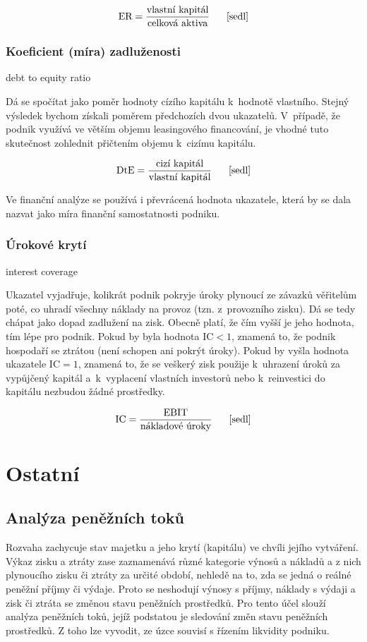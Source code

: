 $$\vz{ER}{vlastní kapitál}{celková aktiva} \scite{sedl}$$

\subsubsection{Koeficient (míra) zadluženosti}
debt to equity ratio

Dá se spočítat jako poměr hodnoty cízího kapitálu k~hodnotě vlastního. Stejný výsledek bychom získali poměrem předchozích dvou ukazatelů. V~případě, že podnik využívá ve větším objemu leasingového financování, je vhodné tuto skutečnost zohlednit přičtením objemu k~cizímu kapitálu. 

$$\vz{DtE}{cizí kapitál}{vlastní kapitál} \scite{sedl}$$

\vspace{3mm}
Ve finanční analýze se používá i převrácená hodnota ukazatele, která by se dala nazvat jako míra finanční samostatnosti podniku.

\subsubsection{Úrokové krytí}
interest coverage

Ukazatel vyjadřuje, kolikrát podnik pokryje úroky plynoucí ze závazků věřitelům poté, co uhradí všechny náklady na provoz (tzn. z~provozního zisku). Dá se tedy chápat jako dopad zadlužení na zisk. Obecně platí, že čím vyšší je jeho hodnota, tím lépe pro podnik. Pokud by byla hodnota IC$<1$, znamená to, že podnik hospodaří se ztrátou (není schopen ani pokrýt úroky). Pokud by vyšla hodnota ukazatele IC$=1$, znamená to, že se veškerý zisk použije k~uhrazení úroků za vypůjčený kapitál a~k~vyplacení vlastních investorů nebo k~reinvestici do kapitálu nezbudou žádné prostředky.

$$\vz{IC}{EBIT}{nákladové úroky} \scite{sedl}$$








\section{Ostatní}

\subsection{Analýza peněžních toků}
Rozvaha zachycuje stav majetku a jeho krytí (kapitálu) ve chvíli jejího vytváření. Výkaz zisku a ztráty zase zaznamenává různé kategorie výnosů a nákladů a z nich plynoucího zisku či ztráty za určité období, nehledě na to, zda se jedná o reálné peněžní příjmy či výdaje. Proto se neshodují výnosy s příjmy, náklady s výdaji a zisk či ztráta se změnou stavu peněžních prostředků. Pro tento účel slouží analýza peněžních toků, jejíž podstatou je sledování změn stavu peněžních prostředků.\cite{komplex} Z toho lze vyvodit, ze úzce souvisí s řízením likvidity podniku.



